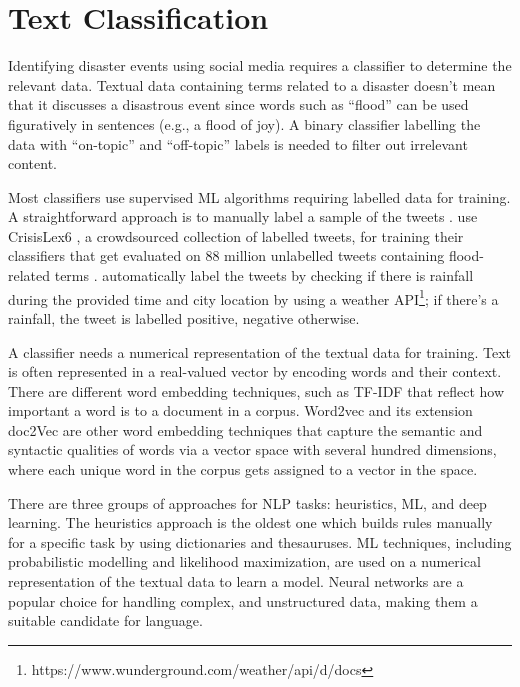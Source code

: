 \section{Text Classification}
Identifying disaster events using social media requires a classifier to determine the relevant data.
Textual data containing terms related to a disaster doesn't mean that it discusses a disastrous
event since words such as ``flood'' can be used figuratively in sentences (e.g., a flood of joy). A
binary classifier labelling the data with ``on-topic'' and ``off-topic'' labels is needed to filter
out irrelevant content.

Most classifiers use supervised \ac{ML} algorithms requiring labelled data for training. A
straightforward approach is to manually label a sample of the tweets
\cite{debruijnGlobalDatabaseHistoric2019b}\cite{barkerDevelopmentNationalscaleRealtime2019}.
 use CrisisLex6
\cite{olteanuCrisisLexLexiconCollecting2014}, a crowdsourced collection of labelled tweets, for training their
classifiers that get evaluated on 88 million unlabelled tweets containing flood-related terms
\cite{DVN/T3ZFMR_2019}.  automatically label the tweets by
checking if there is rainfall during the provided time and city location by using a weather
\ac{API}\footnote{https://www.wunderground.com/weather/api/d/docs}; if there's a rainfall, the tweet
is labelled positive, negative otherwise.

A classifier needs a numerical representation of the textual data for training. Text is often
represented in a real-valued vector by encoding words and their context. There are different word
embedding techniques, such as \ac{TF-IDF} \cite{enwiki:1123031029} that reflect how important a word
is to a document in a corpus. Word2vec \cite{mikolovEfficientEstimationWord2013} and its extension
doc2Vec \cite{leDistributedRepresentationsSentences2014} are other word embedding techniques that
capture the semantic and syntactic qualities of words via a vector space with several hundred
dimensions, where each unique word in the corpus gets assigned to a vector in the space.

There are three groups of approaches for \ac{NLP} tasks: heuristics, \ac{ML}, and deep
learning. The heuristics approach is the oldest one which builds rules manually for a specific task
by using dictionaries and thesauruses. \ac{ML} techniques, including probabilistic
modelling and likelihood maximization, are used on a numerical representation of the textual data to
learn a model. Neural networks are a popular choice for handling complex, and unstructured data,
making them a suitable candidate for language.

